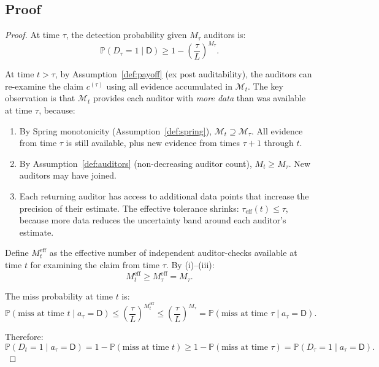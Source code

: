 \documentclass[11pt,a4paper]{article}
\theoremstyle{definition}
\theoremstyle{remark}
\newcommand{\Pbb}{\mathbb{P}}
\newcommand{\cM}{\mathcal{M}}
\newcommand{\dishonest}{\mathsf{D}}
\newcommand{\claim}{c}
\newcommand{\threshold}{\tau}
\newcommand{\tol}{L}
\begin{document}
\subsection{Proof}

\begin{proof}
At time $\tau$, the detection probability given $M_\tau$ auditors is:
\begin{equation}
    \Pbb(D_\tau = 1 \mid \dishonest) \geq 1 - \left(\frac{\threshold}{\tol}\right)^{M_\tau}.
\end{equation}

At time $t > \tau$, by Assumption~\ref{def:payoff} (ex post auditability), the auditors can re-examine the claim $\claim^{(\tau)}$ using all evidence accumulated in $\cM_t$. The key observation is that $\cM_t$ provides each auditor with \emph{more data} than was available at time $\tau$, because:
\begin{enumerate}[label=(\roman*)]
    \item By Spring monotonicity (Assumption~\ref{def:spring}), $\cM_t \supseteq \cM_\tau$. All evidence from time $\tau$ is still available, plus new evidence from times $\tau+1$ through $t$.
    \item By Assumption~\ref{def:auditors} (non-decreasing auditor count), $M_t \geq M_\tau$. New auditors may have joined.
    \item Each returning auditor has access to additional data points that increase the precision of their estimate. The effective tolerance shrinks: $\threshold_{\text{eff}}(t) \leq \threshold$, because more data reduces the uncertainty band around each auditor's estimate.
\end{enumerate}

Define $M_t^{\text{eff}}$ as the effective number of independent auditor-checks available at time $t$ for examining the claim from time $\tau$. By (i)--(iii):
\begin{equation}
    M_t^{\text{eff}} \geq M_\tau^{\text{eff}} = M_\tau.
\end{equation}

The miss probability at time $t$ is:
\begin{equation}
    \Pbb(\text{miss at time } t \mid a_\tau = \dishonest)
    \leq \left(\frac{\threshold}{\tol}\right)^{M_t^{\text{eff}}}
    \leq \left(\frac{\threshold}{\tol}\right)^{M_\tau}
    = \Pbb(\text{miss at time } \tau \mid a_\tau = \dishonest).
\end{equation}

Therefore:
\begin{equation}
    \Pbb(D_t = 1 \mid a_\tau = \dishonest)
    = 1 - \Pbb(\text{miss at time } t)
    \geq 1 - \Pbb(\text{miss at time } \tau)
    = \Pbb(D_\tau = 1 \mid a_\tau = \dishonest).
\end{equation}


\end{proof}
\end{document}
